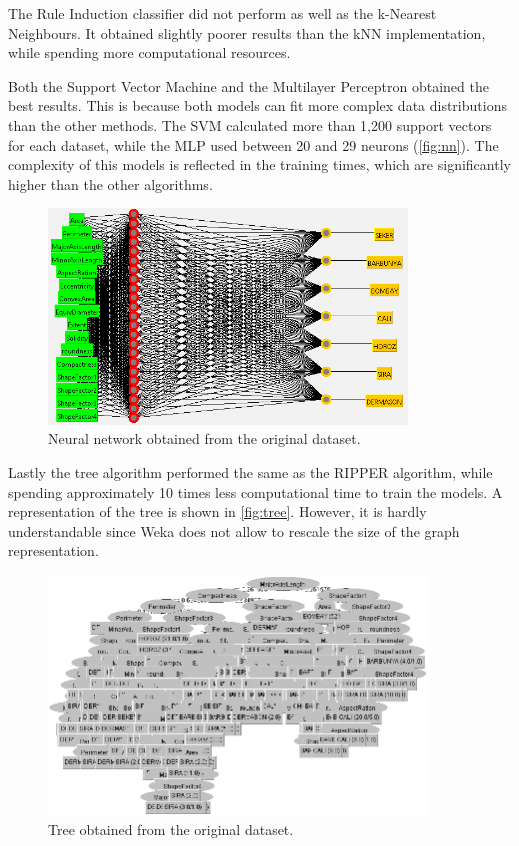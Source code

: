 \documentclass[a4paper,11pt]{article}
\begin{document}
The Rule Induction classifier did not perform as well as the k-Nearest Neighbours. It obtained slightly poorer results than the kNN implementation, while spending more computational resources.

Both the Support Vector Machine and the Multilayer Perceptron obtained the best results. This is because both models can fit more complex data distributions than the other methods. The SVM calculated more than 1,200 support vectors for each dataset, while the MLP used between 20 and 29 neurons (\autoref{fig:nn}). The complexity of this models is reflected in the training times, which are significantly higher than the other algorithms.

\begin{figure}[h]
\centering
\includegraphics[width=0.85\textwidth]{nn}
\caption{Neural network obtained from the original dataset.}
\label{fig:nn}
\end{figure}

Lastly the tree algorithm performed the same as the RIPPER algorithm, while spending approximately 10 times less computational time to train the models. A representation of the tree is shown in \autoref{fig:tree}. However, it is hardly understandable since Weka does not allow to rescale the size of the graph representation.

\begin{figure}[h]
\centering
\includegraphics[width=0.9\textwidth]{tree}
\caption{Tree obtained from the original dataset.}
\label{fig:tree}
\end{figure}
\end{document}

